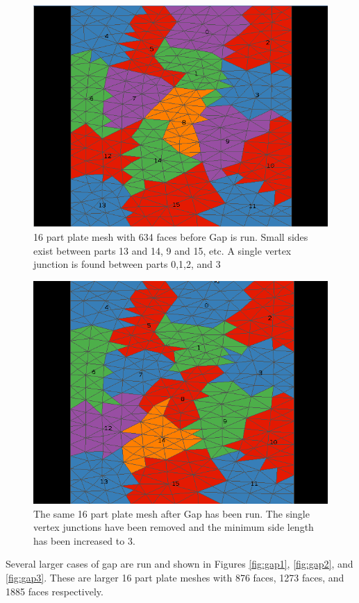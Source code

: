 \documentclass{thesis}
\begin{document}
\begin{figure} [!hb]
\centering
\captionsetup{justification=centering,margin=1cm}
\includegraphics[width=.6\textwidth]{results_before.png}
\caption{\label{fig:plate} \textnormal{16 part plate mesh with 634 faces before Gap is run. Small sides exist between parts 13 and 14, 9 and 15, etc. A single vertex junction is found between parts 0,1,2, and 3}}
\end{figure}

\begin{figure} [!ht]
\centering
\captionsetup{justification=centering,margin=1cm}
\includegraphics[width=.6\textwidth]{results_after.png}
\caption{\label{fig:plate_gap} \textnormal{The same 16 part plate mesh after Gap has been run. The single vertex junctions have been removed and the minimum side length has been increased to 3.}}
\end{figure}

Several larger cases of gap are run and shown in Figures \ref{fig:gap1}, \ref{fig:gap2}, and \ref{fig:gap3}. These are larger 16 part plate meshes with 876 faces, 1273 faces, and 1885 faces respectively.  
\end{document}

